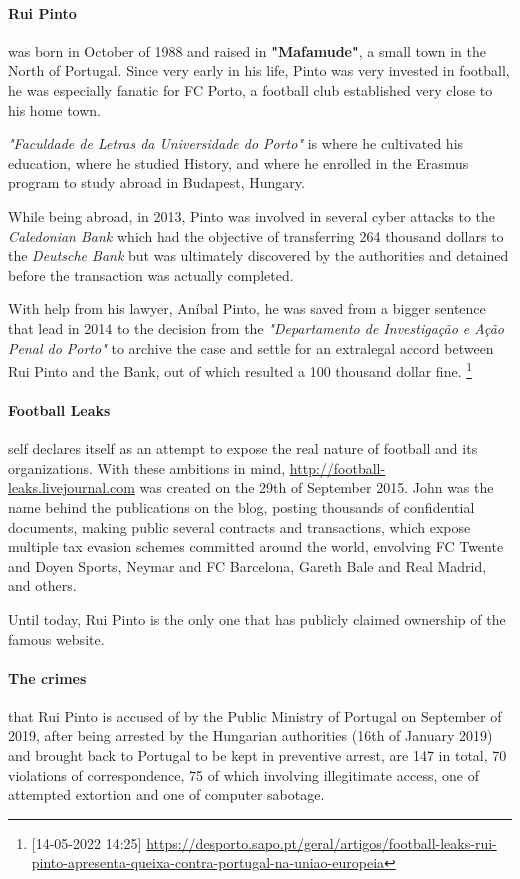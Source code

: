 \paragraph{Rui Pinto}
was born in October of 1988 and raised in \textbf{"Mafamude"}, a small town in the North of Portugal.
Since very early in his life, Pinto was very invested in football, he was especially fanatic for FC Porto, a football club established very close to his home town.

\textit{"Faculdade de Letras da Universidade do Porto"} is where he cultivated his education, where he studied History, and where he enrolled in the Erasmus program to study abroad in Budapest, Hungary.

While being abroad, in 2013, Pinto was involved in several cyber attacks to the \textit{Caledonian Bank} which had the objective of transferring 264 thousand dollars to the \textit{Deutsche Bank} but was ultimately discovered by the authorities and detained before the transaction was actually completed.

With help from his lawyer, Aníbal Pinto, he was saved from a bigger sentence that lead in 2014 to the decision from the \textit{"Departamento de Investigação e Ação Penal do Porto"} to archive the case and settle for an extralegal accord between Rui Pinto and the Bank, out of which resulted a 100 thousand dollar fine.
\footnote{[14-05-2022 14:25] \url{https://desporto.sapo.pt/geral/artigos/football-leaks-rui-pinto-apresenta-queixa-contra-portugal-na-uniao-europeia}}


\paragraph{Football Leaks} self declares itself as an attempt to expose the real nature of football and its organizations.
With these ambitions in mind, \url{http://football-leaks.livejournal.com} was created on the 29th of September 2015.
John was the name behind the publications on the blog, posting thousands of confidential documents, making public several contracts and transactions, which expose multiple tax evasion schemes committed around the world, envolving FC Twente and Doyen Sports, Neymar and FC Barcelona, Gareth Bale and Real Madrid, and others.

Until today, Rui Pinto is the only one that has publicly claimed ownership of the famous website.

\paragraph{The crimes} that Rui Pinto is accused of by the Public Ministry of Portugal on September of 2019, after being arrested by the Hungarian authorities (16th of January 2019) and brought back to Portugal to be kept in preventive arrest, are 147 in total, 70 violations of correspondence, 75 of which involving illegitimate access, one of attempted extortion and one of computer sabotage.

